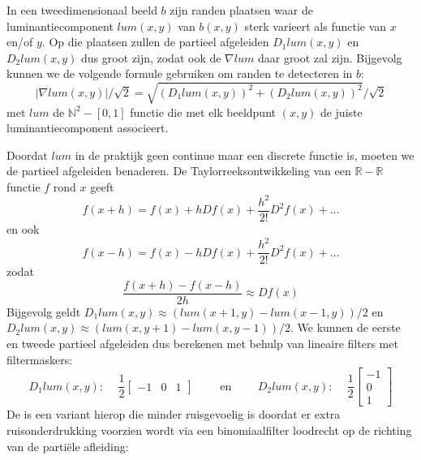 In een tweedimensionaal beeld $b$ zijn randen plaatsen waar de luminantiecomponent $lum(x,y)$ van $b(x,y)$ 
sterk varieert als functie van $x$ en/of $y$. Op die plaatsen zullen de partieel afgeleiden $D_1 lum(x,y)$ en 
$D_2 lum(x,y)$ dus groot zijn, zodat ook de  $\nabla lum$ daar groot zal zijn. Bijgevolg kunnen we
de volgende formule gebruiken om randen te detecteren in $b$: 
\begin{displaymath}
|\nabla lum(x,y)| / \sqrt{2} = \sqrt{(D_1 lum(x,y))^2 + (D_2 lum(x,y))^2} / \sqrt{2}
\end{displaymath}
met $lum$ de $\mathbb{N}^2 - [0,1]$ functie die met elk beeldpunt $(x,y)$ de juiste luminantiecomponent associeert.

Doordat $lum$ in de praktijk geen continue maar een discrete functie is, moeten we de partieel afgeleiden benaderen.
De Taylorreeksontwikkeling van een $\mathbb{R} - \mathbb{R}$ functie $f$ rond $x$ geeft
\begin{displaymath}
f(x+h) = f(x) + h D f(x) + \frac{h^2}{2!} D^2 f(x) + \ldots
\end{displaymath}
en ook
\begin{displaymath}
f(x-h) = f(x) - h D f(x) + \frac{h^2}{2!} D^2 f(x) + \ldots
\end{displaymath}
zodat
\begin{displaymath}
\frac{f(x+h) - f(x-h)}{2h} \approx D f(x)
\end{displaymath}
Bijgevolg geldt $D_1 lum(x,y) \approx (lum(x+1,y) - lum(x-1,y))/2$ en $D_2 lum(x,y) \approx (lum(x,y+1) - lum(x,y-1))/2$. We
kunnen de eerste en tweede partieel afgeleiden dus berekenen met behulp van lineaire filters met filtermaskers:
\begin{displaymath}
D_1 lum(x,y)\textrm{: }\quad \frac{1}{2} \left[ \begin{array}{ccc} -1 & 0 & 1 \end{array} \right] \qquad \textrm{ en } 
\qquad D_2 lum(x,y)\textrm{: }\quad \frac{1}{2} \left[ \begin{array}{c} -1 \\ 0 \\ 1 \end{array} \right]
\end{displaymath}
De  is een variant hierop die minder ruisgevoelig is doordat er 
extra ruisonderdrukking voorzien wordt via een binomiaalfilter loodrecht op de richting 
van de parti\"ele afleiding:

